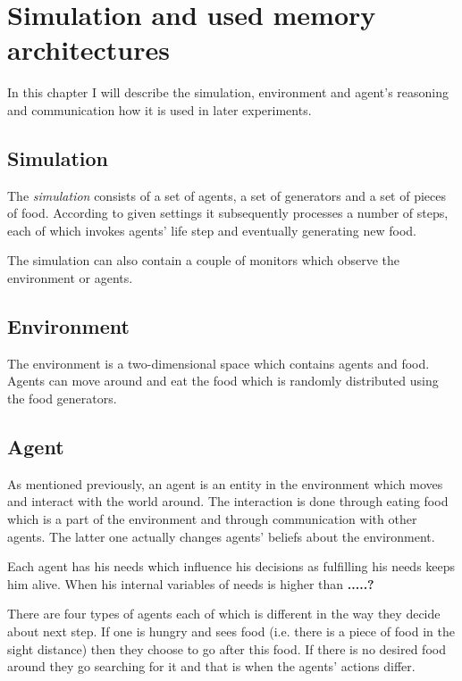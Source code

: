 \chapter{Simulation and used memory architectures}

In this chapter I will describe the simulation, environment and agent's reasoning and communication how it is used in later experiments. 

\section{Simulation}

The \emph{simulation} consists of a set of agents, a set of generators and a set of pieces of food. According to given settings it subsequently processes a number of steps, each of which invokes agents' life step and eventually generating new food.

The simulation can also contain a couple of monitors which observe the environment or agents.

\section{Environment}

The environment is a two-dimensional space which contains agents and food. Agents can move around and eat the food which is randomly distributed using the food generators. 

\section{Agent}                                                      
As mentioned previously, an agent is an entity in the environment which moves and interact with the world around. The interaction is done through eating food which is a part of the environment and through communication with other agents. The latter one actually changes agents' beliefs about the environment.

Each agent has his needs which influence his decisions as fulfilling his needs keeps him alive. When his internal variables of needs is higher than \textbf{.....?}

There are four types of agents each of which is different in the way they decide about next step. If one is hungry and sees food (i.e. there is a piece of food in the sight distance) then they choose to go after this food. If there is no desired food around they go searching for it and that is when the agents' actions differ.

